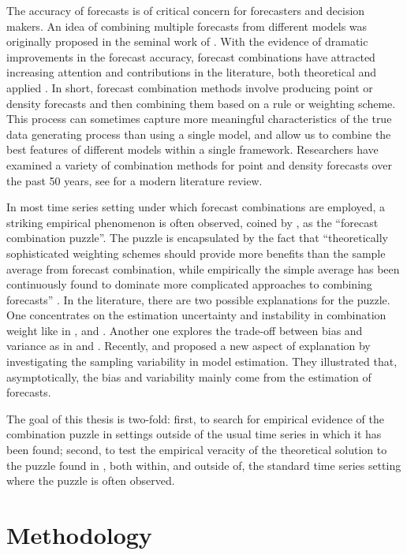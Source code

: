 \documentclass{monashthesis}
\begin{document}
The accuracy of forecasts is of critical concern for forecasters and decision makers. An idea of combining multiple forecasts from different models was originally proposed in the seminal work of \textcite{BG69}. With the evidence of dramatic improvements in the forecast accuracy, forecast combinations have attracted increasing attention and contributions in the literature, both theoretical and applied \autocite{C89,T06}. In short, forecast combination methods involve producing point or density forecasts and then combining them based on a rule or weighting scheme. This process can sometimes capture more meaningful characteristics of the true data generating process than using a single model, and allow us to combine the best features of different models within a single framework. Researchers have examined a variety of combination methods for point and density forecasts over the past 50 years, see \textcite{WHLK22} for a modern literature review.

In most time series setting under which forecast combinations are employed, a striking empirical phenomenon is often observed, coined by \textcite{SW04}, as the ``forecast combination puzzle''. The puzzle is encapsulated by the fact that ``theoretically sophisticated weighting schemes should provide more benefits than the sample average from forecast combination, while empirically the simple average has been continuously found to dominate more complicated approaches to combining forecasts'' \autocite{WHLK22}. In the literature, there are two possible explanations for the puzzle. One concentrates on the estimation uncertainty and instability in combination weight like in \textcite{SW98}, \textcite{SW04} and \textcite{SW09}. Another one explores the trade-off between bias and variance as in \textcite{E11} and \textcite{CMVW16}. Recently, \textcite{ZMFP22} and \textcite{FZMP23} proposed a new aspect of explanation by investigating the sampling variability in model estimation. They illustrated that, asymptotically, the bias and variability mainly come from the estimation of forecasts.

The goal of this thesis is two-fold: first, to search for empirical evidence of the combination puzzle in settings outside of the usual time series in which it has been found; second, to test the empirical veracity of the theoretical solution to the puzzle found in \textcite{FZMP23}, both within, and outside of, the standard time series setting where the puzzle is often observed.

\hypertarget{methodology}{%
\chapter{Methodology}\label{methodology}}
\end{document}
